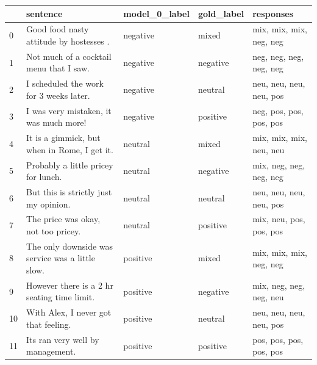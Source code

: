 \begin{tabular}{lllll}
\toprule
{} &                                          sentence & model\_0\_label & gold\_label &                responses \\
\midrule
0  &           Good food nasty attitude by hostesses . &      negative &      mixed &  mix, mix, mix, neg, neg \\
1  &           Not much of a cocktail menu that I saw. &      negative &   negative &  neg, neg, neg, neg, neg \\
2  &           I scheduled the work for 3 weeks later. &      negative &    neutral &  neu, neu, neu, neu, pos \\
3  &            I was very mistaken, it was much more! &      negative &   positive &  neg, pos, pos, pos, pos \\
4  &      It is a gimmick, but when in Rome, I get it. &       neutral &      mixed &  mix, mix, mix, neu, neu \\
5  &               Probably a little pricey for lunch. &       neutral &   negative &  mix, neg, neg, neg, neg \\
6  &             But this is strictly just my opinion. &       neutral &    neutral &  neu, neu, neu, neu, pos \\
7  &               The price was okay, not too pricey. &       neutral &   positive &  mix, neu, pos, pos, pos \\
8  &  The only downside was service was a little slow. &      positive &      mixed &  mix, mix, mix, neg, neg \\
9  &       However there is a 2 hr seating time limit. &      positive &   negative &  mix, neg, neg, neg, neu \\
10 &              With Alex, I never got that feeling. &      positive &    neutral &  neu, neu, neu, neu, pos \\
11 &                  Its ran very well by management. &      positive &   positive &  pos, pos, pos, pos, pos \\
\bottomrule
\end{tabular}
